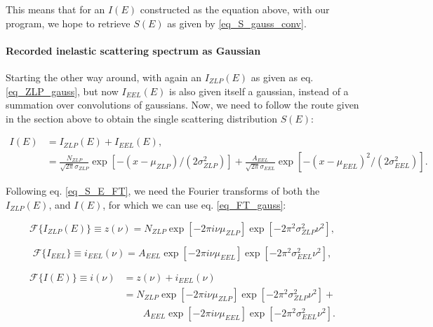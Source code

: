 This means that for an $I(E)$ constructed as the equation above, with our program, we hope to retrieve $S(E)$ as given by \eqref{eq_S_gauss_conv}.

















\paragraph{Recorded inelastic scattering spectrum as Gaussian}
Starting the other way around, with again an $I_{ZLP}(E)$ as given as eq. \eqref{eq_ZLP_gauss}, but now $I_{EEL}(E)$ is also given itself a gaussian, instead of a summation over convolutions of gaussians. Now, we need to follow the route given in the section above to obtain the single scattering distribution $S(E)$:

\begin{equation}
\begin{aligned}
I(E) &= I_{ZLP}(E) + I_{EEL}(E),\\
&= \frac{N_{ZLP}}{\sqrt{2\pi}\sigma_{ZLP}} \exp{[-(x-\mu_{ZLP})/(2\sigma_{ZLP}^2)]} +\frac{A_{EEL}}{\sqrt{2\pi}\sigma_{EEL}} \exp{[-(x-\mu_{EEL})^2/(2\sigma_{EEL}^2)]}.
\end{aligned}
\end{equation}

Following eq. \eqref{eq_S_E_FT}, we need the Fourier transforms of both the $I_{ZLP}(E)$, and $I(E)$, for which we can use eq. \eqref{eq_FT_gauss}:

\begin{equation}\label{eq_i_nu_gauss}
    \mathcal{F}\{I_{ZLP}(E)\} \equiv z(\nu) = N_{ZLP}\exp{\left[-2 \pi i \nu \mu_{ZLP}\right]} \exp{\left[-2 \pi^{2} \sigma_{ZLP}^{2} \nu^{2}\right]},
\end{equation}

\begin{equation}\label{eq_i_EEL_gauss}
    \mathcal{F}\{I_{EEL}\} \equiv i_{EEL}(\nu) = A_{EEL} \exp{\left[-2 \pi i \nu \mu_{EEL}\right]} \exp{\left[-2 \pi^{2} \sigma_{EEL}^{2} \nu^{2}\right]},
\end{equation}

\begin{equation}
\begin{aligned}
\mathcal{F}\{I(E)\} \equiv i(\nu) &= z(\nu) + i_{EEL}(\nu) \\
&= N_{ZLP}  \exp{\left[-2 \pi i \nu \mu_{ZLP}\right]} \exp{\left[-2 \pi^{2} \sigma_{ZLP}^{2} \nu^{2}\right]} + \\
& \quad \quad A_{EEL}  \exp{\left[-2 \pi i \nu \mu_{EEL}\right]} \exp{\left[-2 \pi^{2} \sigma_{EEL}^{2} \nu^{2}\right]}.
\end{aligned}
\end{equation}



